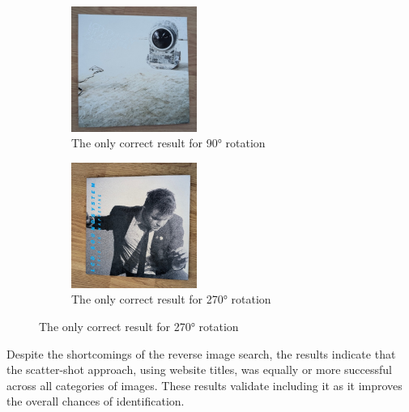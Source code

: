 \begin{figure} [H]
    \captionsetup{justification=centering}
    \centering
    \begin{subfigure}[t]{0.45\textwidth}
        \centering
        \includegraphics[width=0.45\textwidth]{figures/test_albums/Sound_Of_Silver_Rotated - 90.jpg}
        \caption{The only correct result for 90° rotation}
        \label{fig:sos_rotated_90}
    \end{subfigure}
    \begin{subfigure}[t]{0.45\textwidth}
        \centering
        \includegraphics[width=0.45\textwidth]{figures/test_albums/This_Is_Happening_Rotated - 270.jpg}
        \caption{The only correct result for 270° rotation}
        \label{fig:tih_rotated_270}
    \end{subfigure}
\end{figure}

Despite the shortcomings of the reverse image search, the results indicate that the scatter-shot approach, using website titles, was equally or more successful across all categories of images. These results validate including it as it improves the overall chances of identification.

